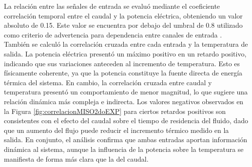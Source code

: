 \documentclass[11pt]{report}
\begin{document}
La relación entre las señales de entrada se evaluó mediante el coeficiente correlación temporal entre el caudal y la potencia eléctrica, obteniendo un valor absoluto de 0.15. Este valor se encuentra por debajo del umbral de 0.8 utilizado como criterio de advertencia para dependencia entre canales de entrada \cite{csurcsia2020user}. También se calculó la correlación cruzada entre cada entrada y la temperatura de  salida. La potencia eléctrica presentó un máximo positivo en un retardo positivo, indicando que sus variaciones anteceden al incremento de temperatura. Esto es físicamente coherente, ya que la potencia constituye la fuente directa de energía térmica del sistema. En cambio, la correlación cruzada entre caudal y temperatura presentó un comportamiento de menor magnitud, lo que sugiere una relación dinámica más compleja e indirecta. Los valores negativos observados en la Figura \ref{fig:correlacionMISO2doEXP} para ciertos retardos positivos son consistentes con el efecto del caudal sobre el tiempo de residencia del fluido, dado que un aumento del flujo puede reducir el incremento térmico medido en la salida. En conjunto, el análisis confirma que ambas entradas aportan información dinámica al sistema, aunque la influencia de la potencia sobre la temperatura se manifiesta de forma más clara que la del caudal.
\end{document}
